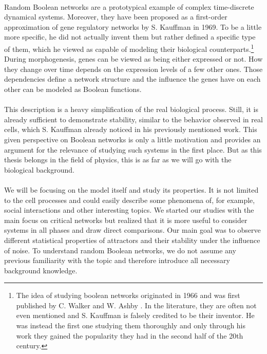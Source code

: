 \paragraph*{}
Random Boolean networks are a prototypical example of complex time-discrete dynamical systems. Moreover, they have been proposed as a first-order approximation of gene regulatory networks by S. Kauffman \cite{kauffman1969metabolic} in 1969. To be a little more specific, he did not actually invent them but rather defined a specific type of them, which he viewed as capable of modeling their biological counterparts.\footnote{The idea of studying boolean networks originated in 1966 and was first published by C. Walker and W. Ashby \cite{walker1966temporal}. In the literature, they are often not even mentioned and S. Kauffman is falsely credited to be their inventor. He was instead the first one studying them thoroughly and only through his work they gained the popularity they had in the second half of the 20th century.} During morphogenesis, genes can be viewed as being either expressed or not. How they change over time depends on the expression levels of a few other ones. Those dependencies define a network structure and the influence the genes have on each other can be modeled as Boolean functions.

\paragraph*{}
This description is a heavy simplification of the real biological process. Still, it is already sufficient to demonstrate stability, similar to the behavior observed in real cells, which S. Kauffman already noticed in his previously mentioned work. This given perspective on Boolean networks is only a little motivation and provides an argument for the relevance of studying such systems in the first place. But as this thesis belongs in the field of physics, this is as far as we will go with the biological background. 

\paragraph*{}

We will be focusing on the model itself and study its properties. It is not limited to the cell processes and could easily describe some phenomena of, for example, social interactions and other interesting topics. We started our studies with the main focus on critical networks but realized that it is more useful to consider systems in all phases and draw direct comparisons. Our main goal was to observe different statistical properties of attractors and their stability under the influence of noise. To understand random Boolean networks, we do not assume any previous familiarity with the topic and therefore introduce all necessary background knowledge.

